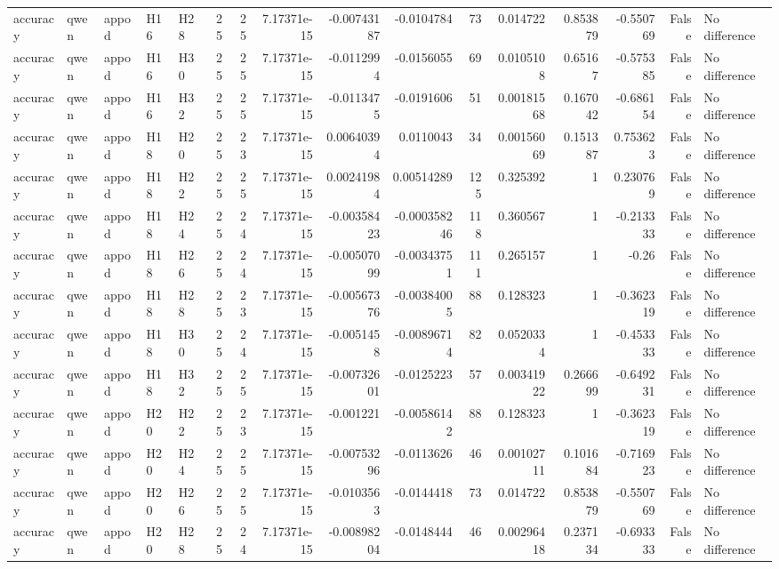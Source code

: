 \begin{longtable}{lllllrrrrrrrrrrl}
accuracy & qwen & appod & H16 & H28 & 25 & 25 & 7.17371e-15 & -0.00743187 & -0.0104784 & 73 & 0.014722 & 0.853879 & -0.550769 & False & No difference \\
accuracy & qwen & appod & H16 & H30 & 25 & 25 & 7.17371e-15 & -0.0112994 & -0.0156055 & 69 & 0.0105108 & 0.65167 & -0.575385 & False & No difference \\
accuracy & qwen & appod & H16 & H32 & 25 & 25 & 7.17371e-15 & -0.0113475 & -0.0191606 & 51 & 0.00181568 & 0.167042 & -0.686154 & False & No difference \\
accuracy & qwen & appod & H18 & H20 & 25 & 23 & 7.17371e-15 & 0.00640394 & 0.0110043 & 34 & 0.00156069 & 0.151387 & 0.753623 & False & No difference \\
accuracy & qwen & appod & H18 & H22 & 25 & 25 & 7.17371e-15 & 0.00241984 & 0.00514289 & 125 & 0.325392 & 1 & 0.230769 & False & No difference \\
accuracy & qwen & appod & H18 & H24 & 25 & 24 & 7.17371e-15 & -0.00358423 & -0.000358246 & 118 & 0.360567 & 1 & -0.213333 & False & No difference \\
accuracy & qwen & appod & H18 & H26 & 25 & 24 & 7.17371e-15 & -0.00507099 & -0.00343751 & 111 & 0.265157 & 1 & -0.26 & False & No difference \\
accuracy & qwen & appod & H18 & H28 & 25 & 23 & 7.17371e-15 & -0.00567376 & -0.00384005 & 88 & 0.128323 & 1 & -0.362319 & False & No difference \\
accuracy & qwen & appod & H18 & H30 & 25 & 24 & 7.17371e-15 & -0.0051458 & -0.00896714 & 82 & 0.0520334 & 1 & -0.453333 & False & No difference \\
accuracy & qwen & appod & H18 & H32 & 25 & 25 & 7.17371e-15 & -0.00732601 & -0.0125223 & 57 & 0.00341922 & 0.266699 & -0.649231 & False & No difference \\
accuracy & qwen & appod & H20 & H22 & 25 & 23 & 7.17371e-15 & -0.001221 & -0.00586142 & 88 & 0.128323 & 1 & -0.362319 & False & No difference \\
accuracy & qwen & appod & H20 & H24 & 25 & 25 & 7.17371e-15 & -0.00753296 & -0.0113626 & 46 & 0.00102711 & 0.101684 & -0.716923 & False & No difference \\
accuracy & qwen & appod & H20 & H26 & 25 & 25 & 7.17371e-15 & -0.0103563 & -0.0144418 & 73 & 0.014722 & 0.853879 & -0.550769 & False & No difference \\
accuracy & qwen & appod & H20 & H28 & 25 & 24 & 7.17371e-15 & -0.00898204 & -0.0148444 & 46 & 0.00296418 & 0.237134 & -0.693333 & False & No difference \\

\end{longtable}
